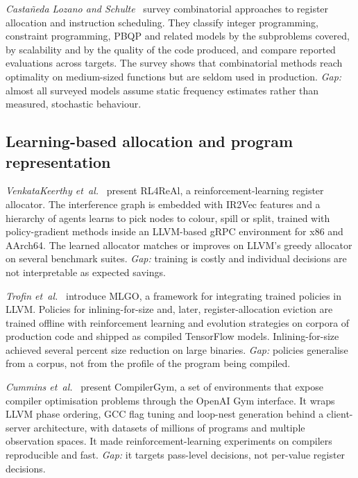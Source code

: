 \documentclass[conference]{IEEEtran}
\begin{document}
\textit{Castañeda Lozano and Schulte}~\cite{lozano2019survey} survey
combinatorial approaches to register allocation and instruction
scheduling. They classify integer programming, constraint programming,
PBQP and related models by the subproblems covered, by scalability and
by the quality of the code produced, and compare reported evaluations
across targets. The survey shows that combinatorial methods reach
optimality on medium-sized functions but are seldom used in production.
\textit{Gap:} almost all surveyed models assume static frequency
estimates rather than measured, stochastic behaviour.

\subsection{Learning-based allocation and program representation}

\textit{VenkataKeerthy et~al.}~\cite{venkatakeerthy2023rl4real} present
RL4ReAl, a reinforcement-learning register allocator. The interference
graph is embedded with IR2Vec features and a hierarchy of agents learns
to pick nodes to colour, spill or split, trained with policy-gradient
methods inside an LLVM-based gRPC environment for x86 and AArch64. The
learned allocator matches or improves on LLVM's greedy allocator on
several benchmark suites. \textit{Gap:} training is costly and
individual decisions are not interpretable as expected savings.

\textit{Trofin et~al.}~\cite{trofin2021mlgo} introduce MLGO, a framework
for integrating trained policies in LLVM. Policies for inlining-for-size
and, later, register-allocation eviction are trained offline with
reinforcement learning and evolution strategies on corpora of production
code and shipped as compiled TensorFlow models. Inlining-for-size
achieved several percent size reduction on large binaries.
\textit{Gap:} policies generalise from a corpus, not from the profile of
the program being compiled.

\textit{Cummins et~al.}~\cite{cummins2022compilergym} present
CompilerGym, a set of environments that expose compiler optimisation
problems through the OpenAI Gym interface. It wraps LLVM phase ordering,
GCC flag tuning and loop-nest generation behind a client-server
architecture, with datasets of millions of programs and multiple
observation spaces. It made reinforcement-learning experiments on
compilers reproducible and fast. \textit{Gap:} it targets pass-level
decisions, not per-value register decisions.
\end{document}
